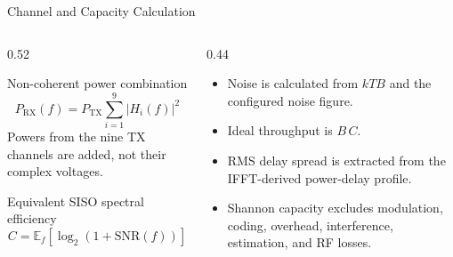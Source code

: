 \begin{frame}[t,shrink=18]{Channel and Capacity Calculation}
    \begin{columns}[T,onlytextwidth]
        \begin{column}{0.52\textwidth}
            \begin{block}{Non-coherent power combination}
                \[
                    P_{\mathrm{RX}}(f)=P_{\mathrm{TX}}
                    \sum_{i=1}^{9}|H_i(f)|^2
                \]
                Powers from the nine TX channels are added, not their complex
                voltages.
            \end{block}
            \begin{block}{Equivalent SISO spectral efficiency}
                \[
                    C=\mathbb E_f\!
                    \left[\log_2\!\left(1+\mathrm{SNR}(f)\right)\right]
                \]
            \end{block}
        \end{column}
        \begin{column}{0.44\textwidth}
            \begin{itemize}
                \item Noise is calculated from $kTB$ and the configured noise
                figure.
                \item Ideal throughput is $B\,C$.
                \item RMS delay spread is extracted from the IFFT-derived
                power-delay profile.
                \item Shannon capacity excludes modulation, coding,
                overhead, interference, estimation, and RF losses.
            \end{itemize}
        \end{column}
    \end{columns}
\end{frame}

